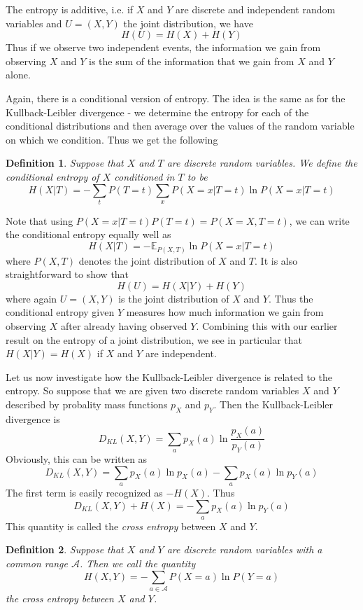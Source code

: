 \documentclass[a4paper, draft]{report}
\numberwithin{section}{chapter}
\numberwithin{equation}{chapter}
\theoremstyle{own}
\newtheorem{defn}{Definition}[section]
\theoremstyle{remark}
\begin{document}
The entropy is additive, i.e. if $X$ and $Y$ are discrete and independent random variables and $U=(X,Y)$ the joint distribution, we have
$$
H(U) = H(X) + H(Y)
$$
Thus if we observe two independent events, the information we gain from observing $X$ and $Y$ is the sum of the information that we gain from $X$ and $Y$ alone.

Again, there is a conditional version of entropy. The idea is the same as for the Kullback-Leibler divergence - we determine the entropy for each of the conditional distributions and then average over the values of the random variable on which we condition. Thus we get the following

\begin{defn}
Suppose that $X$ and $T$ are discrete random variables. We define the conditional entropy of $X$ conditioned in $T$ to be
$$
H(X | T) = - \sum_t P(T = t)  \sum_x P(X = x | T = t) \ln P(X = x | T = t) 
$$
\end{defn}

Note that using $P(X = x | T = t) P(T=t) = P(X = X, T = t)$, we can write the conditional entropy equally well as
$$
H(X | T) = - \mathbb{E}_{P(X,T)} \ln P(X = x | T = t)
$$
where $P(X,T)$ denotes the joint distribution of $X$ and $T$. It is also straightforward to show that
$$
H(U) = H(X | Y) + H(Y)
$$
where again $U = (X,Y)$ is the joint distribution of $X$ and $Y$. Thus the conditional entropy given $Y$ measures how much information we gain from observing $X$ after already having observed $Y$. Combining this with our earlier result on the entropy of a joint distribution, we see in particular that $H(X | Y) = H(X)$ if $X$ and $Y$ are independent.

Let us now investigate how the Kullback-Leibler divergence is related to the entropy. So suppose that we are given two discrete random variables $X$ and $Y$ described by probality mass functions $p_X$ and $p_Y$. Then the Kullback-Leibler divergence is
$$
D_{KL}(X,Y) = \sum_a p_X(a) \ln \frac{p_X(a)}{p_Y(a)}
$$
Obviously, this can be written as
$$
D_{KL}(X,Y) = \sum_a p_X(a) \ln p_X(a) - \sum_a p_X(a) \ln p_Y(a)
$$
The first term is easily recognized as $-H(X)$. Thus
$$
D_{KL}(X,Y) + H(X) = - \sum_a p_X(a) \ln p_Y(a)
$$
This quantity is called the {\em cross entropy} between $X$ and $Y$. 

\begin{defn}
Suppose that $X$ and $Y$ are discrete random variables with a common range ${\mathcal A}$. Then we call the quantity
$$
H(X,Y) = - \sum_{a \in {\mathcal A}} P(X = a) \ln P(Y = a)
$$
the cross entropy between $X$ and $Y$. 
\end{defn}
\end{document}
